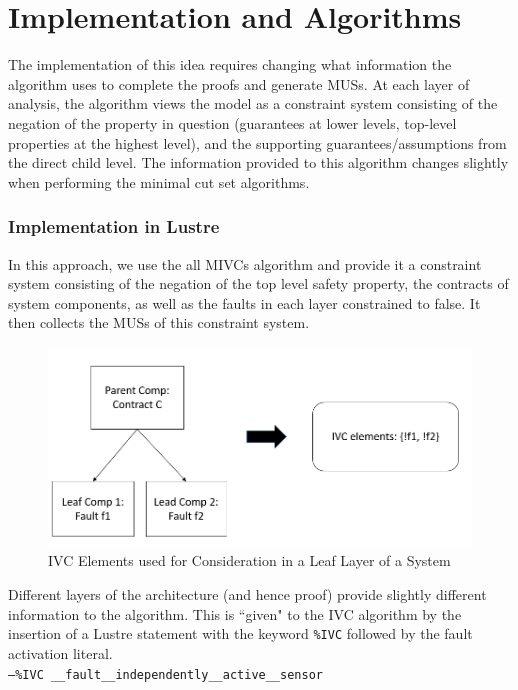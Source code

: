 \section{Implementation and Algorithms}
\label{sec:algs}
The implementation of this idea requires changing what information the \aivcalg algorithm uses to complete the proofs and generate MUSs. At each layer of analysis, the \aivcalg algorithm views the model as a constraint system consisting of the negation of the property in question (guarantees at lower levels, top-level properties at the highest level), and the supporting guarantees/assumptions from the direct child level. The information provided to this algorithm changes slightly when performing the minimal cut set algorithms.

\subsubsection{Implementation in Lustre}
In this approach, we use the all MIVCs algorithm and provide it a constraint system consisting of the negation of the top level safety property, the contracts of system components, as well as the faults in each layer constrained to false. It then collects the MUSs of this constraint system.

\begin{figure}[htbp]
	\hspace*{-2cm}
	\vspace{-0.1in} 
	\begin{center}
		\includegraphics[scale=0.5]{images/ivcElements1.png}
	\caption{IVC Elements used for Consideration in a Leaf Layer of a System}
		\label{fig:ivcElements1}
	\end{center}
\end{figure}

Different layers of the architecture (and hence proof) provide slightly different information to the \aivcalg algorithm. This is ``given" to the IVC algorithm by the insertion of a Lustre statement with the keyword \texttt{\%IVC} followed by the fault activation literal. \\ \texttt{--\%IVC \_\_fault\_\_independently\_\_active\_\_sensor}\\

